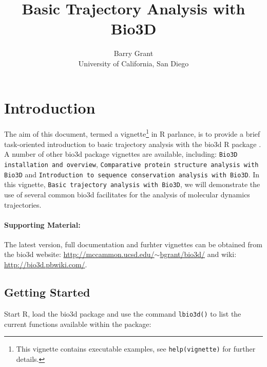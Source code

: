 \documentclass[letter]{article}
\title{Basic Trajectory Analysis with Bio3D}
\author{Barry Grant\\
University of California, San Diego}
\begin{document}
\maketitle
\tableofcontents

\section{Introduction}
The aim of this document, termed a vignette\footnote{This vignette contains executable examples, see \texttt{help(vignette)} for further details.} in R parlance, is to provide a brief task-oriented introduction to basic trajectory analysis with the bio3d R package \citep{grant06}.  A number of other bio3d package vignettes are available, including: \texttt{Bio3D installation and overview}, \texttt{Comparative protein structure analysis with Bio3D} and \texttt{Introduction to sequence conservation analysis with Bio3D}.  In this vignette, \texttt{Basic trajectory analysis with Bio3D}, we will demonstrate the use of several common bio3d facilitates for the analysis of molecular dynamics trajectories.



\paragraph{Supporting Material:}
The latest version, full documentation and furhter vignettes can be obtained from the bio3d website: \href{http://mccammon.ucsd.edu/~bgrant/bio3d/}{http://mccammon.ucsd.edu/$\sim$bgrant/bio3d/} and wiki: \href{http://bio3d.pbwiki.com/}{http://bio3d.pbwiki.com/}.




\subsection{Getting Started}
Start R, load the bio3d package and use the command \texttt{lbio3d()} to list the current functions available within the package:
\end{document}

